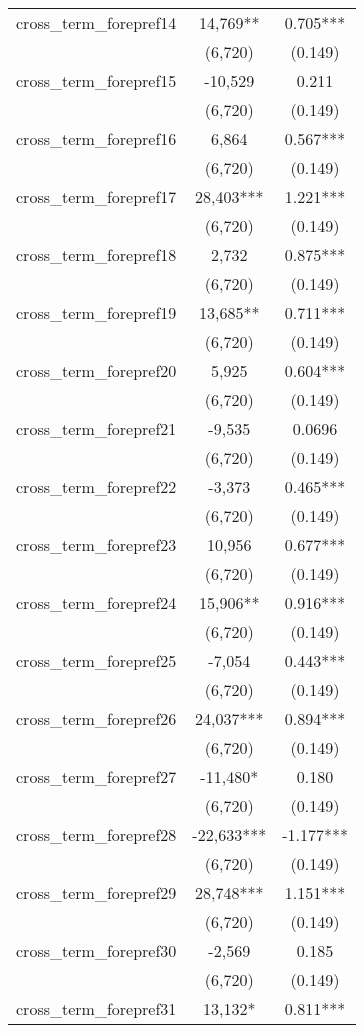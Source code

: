 \documentclass[]{article}
\begin{document}
\begin{tabular}{lcc}
cross\_term\_forepref14 & 14,769** & 0.705*** \\
 & (6,720) & (0.149) \\
cross\_term\_forepref15 & -10,529 & 0.211 \\
 & (6,720) & (0.149) \\
cross\_term\_forepref16 & 6,864 & 0.567*** \\
 & (6,720) & (0.149) \\
cross\_term\_forepref17 & 28,403*** & 1.221*** \\
 & (6,720) & (0.149) \\
cross\_term\_forepref18 & 2,732 & 0.875*** \\
 & (6,720) & (0.149) \\
cross\_term\_forepref19 & 13,685** & 0.711*** \\
 & (6,720) & (0.149) \\
cross\_term\_forepref20 & 5,925 & 0.604*** \\
 & (6,720) & (0.149) \\
cross\_term\_forepref21 & -9,535 & 0.0696 \\
 & (6,720) & (0.149) \\
cross\_term\_forepref22 & -3,373 & 0.465*** \\
 & (6,720) & (0.149) \\
cross\_term\_forepref23 & 10,956 & 0.677*** \\
 & (6,720) & (0.149) \\
cross\_term\_forepref24 & 15,906** & 0.916*** \\
 & (6,720) & (0.149) \\
cross\_term\_forepref25 & -7,054 & 0.443*** \\
 & (6,720) & (0.149) \\
cross\_term\_forepref26 & 24,037*** & 0.894*** \\
 & (6,720) & (0.149) \\
cross\_term\_forepref27 & -11,480* & 0.180 \\
 & (6,720) & (0.149) \\
cross\_term\_forepref28 & -22,633*** & -1.177*** \\
 & (6,720) & (0.149) \\
cross\_term\_forepref29 & 28,748*** & 1.151*** \\
 & (6,720) & (0.149) \\
cross\_term\_forepref30 & -2,569 & 0.185 \\
 & (6,720) & (0.149) \\
cross\_term\_forepref31 & 13,132* & 0.811*** \\

\end{tabular}
\end{document}
